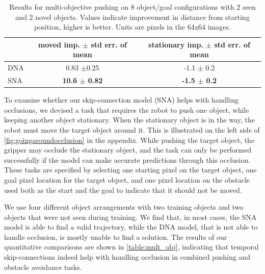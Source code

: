 \begin{table}
\centering
{\footnotesize
\begin{tabular}{lcc}
	\toprule
         &  \thead{moved imp. \\ $\pm$ std err. of mean} &   \thead{stationary imp. \\ $\pm$ std err. of mean}  \\
         \midrule
  DNA \cite{foresight} & 0.83 $\pm$0.25 &  -1.1 $\pm$ 0.2\\ 
  SNA & \textbf{10.6 $\pm$ 0.82} & \textbf{-1.5 $\pm$ 0.2} \\
  \bottomrule
\end{tabular}
}
\caption{Results for multi-objective pushing on 8 object/goal configurations with 2 seen and 2 novel objects. Values indicate improvement in distance from starting position, higher is better. Units are pixels in the 64x64 images.} 
\label{table:mult_obj}
\end{table}

To examine whether our skip-connection model (SNA) helps with handling occlusions, we devised a task that requires the robot to push one object, while keeping another object stationary. When the stationary object is in the way, the robot must move the target object around it. This is illustrated on the left side of \autoref{fig:goingaroundocclusion} in the appendix. While pushing the target object, the gripper may occlude the stationary object, and the task can only be performed successfully if the model can make accurate predictions through this occlusion. These tasks are specified by selecting one starting pixel on the target object, one goal pixel location for the target object, and one pixel location on the obstacle used both as the start and the goal to indicate that it should not be moved. %

We use four different object arrangements with two training objects and two objects that were not seen during training. We find that, in most cases, the SNA model is able to find a valid trajectory, while the DNA model, that is not able to handle occlusion, is mostly unable to find a solution. The results of our quantitative comparisons are shown in \autoref{table:mult_obj}, indicating that temporal skip-connections indeed help with handling occlusion in combined pushing and obstacle avoidance tasks. 

